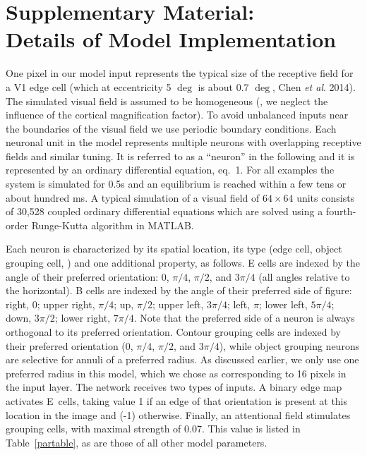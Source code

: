 \section*{Supplementary Material: \\
Details of Model Implementation}
\label{sec:appendix}
One pixel in our model input represents the typical size of the receptive
field for 
a V1
edge cell (which at eccentricity 5 $\deg$ is about 0.7
$\deg$, Chen {\em et al}. 2014).  The simulated visual field is
assumed to be homogeneous
(\ie, we neglect the influence of the cortical magnification factor).  
To avoid unbalanced inputs near the
boundaries of the visual field we use periodic boundary
conditions. Each neuronal unit in the model represents multiple
neurons with overlapping receptive fields and similar tuning.  It is
referred to as a ``neuron'' in the following and it is represented by
an ordinary differential equation, eq.~1.  For all examples the system
is simulated for 0.5s and an equilibrium is reached within a few tens
or about hundred ms.  A typical simulation of a visual field of
$64\times 64$ units consists of 30,528 coupled ordinary differential
equations which are solved using a fourth-order Runge-Kutta  algorithm
in MATLAB.

Each neuron is characterized by its spatial location, its type (edge
cell, object grouping cell, \etc) and one additional property, as
follows. E cells are indexed by the angle of their preferred
orientation: $0$, $\pi/4$, $\pi/2$, and $3\pi/4$
(all angles relative to the horizontal). 
B cells are indexed
by the angle of their preferred side of figure: right, $0$; upper
right, $\pi/4$; up, $\pi/2$; upper left, $3\pi/4$; left, $\pi$; lower
left, $5\pi/4$; down, $3\pi/2$; lower right, $7\pi/4$. 
Note that the preferred side of a neuron is always
orthogonal to its preferred orientation. Contour
grouping cells are indexed by their preferred orientation ($0$,
$\pi/4$, $\pi/2$, and $3\pi/4$), while object grouping neurons are
selective for annuli of a preferred radius.
As discussed earlier, we only use one preferred radius in this model,
which we chose as corresponding to 16 pixels in the input layer.
The network receives two types
of inputs. A binary edge map activates E~cells, taking value 1 if an
edge of that orientation is present
at this location in the image and (-1)
otherwise. Finally, an attentional field stimulates grouping cells,
with maximal strength of 0.07. This value is listed in
Table~\ref{partable}, as are those of all other model parameters.

